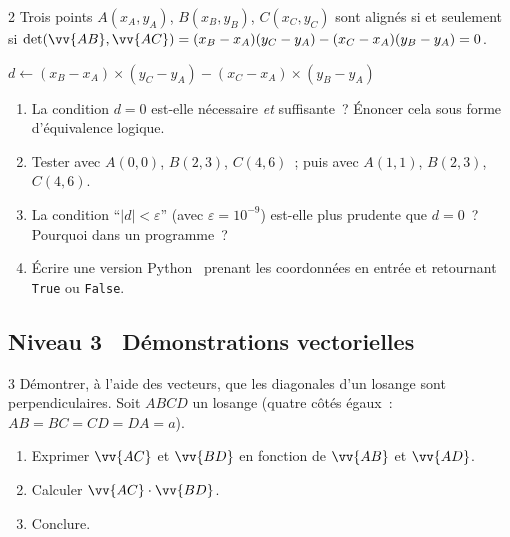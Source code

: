 \begin{exo}{2}
Trois points $A(x_A,y_A)$, $B(x_B,y_B)$, $C(x_C,y_C)$ sont align\'es
si et seulement si $\det(\vv{AB},\vv{AC}) = (x_B-x_A)(y_C-y_A)-(x_C-x_A)(y_B-y_A) = 0$.

\begin{algorithm}[H]
\caption{Test d'alignement de trois points}
$d \leftarrow (x_B-x_A)\times(y_C-y_A) - (x_C-x_A)\times(y_B-y_A)$\;
\end{algorithm}

\begin{enumerate}
  \item La condition $d=0$ est-elle n\'ecessaire \emph{et} suffisante~?
        \'Enoncer cela sous forme d'\'equivalence logique.
  \item Tester avec $A(0,0)$, $B(2,3)$, $C(4,6)$~;
        puis avec $A(1,1)$, $B(2,3)$, $C(4,6)$.
  \item La condition ``$|d| < \varepsilon$'' (avec $\varepsilon=10^{-9}$)
        est-elle plus prudente que $d=0$~?
        Pourquoi dans un programme~?
  \item \'Ecrire une version Python \computer\ prenant les coordonn\'ees
        en entr\'ee et retournant \texttt{True} ou \texttt{False}.
\end{enumerate}
\end{exo}

\subsection*{\quad Niveau 3 \textemdash\ D\'emonstrations vectorielles}

\begin{exo}{3}
D\'emontrer, \`a l'aide des vecteurs, que les diagonales d'un losange
sont perpendiculaires.
Soit $ABCD$ un losange (quatre c\^ot\'es \'egaux~: $AB=BC=CD=DA=a$).
\begin{enumerate}
  \item Exprimer $\vv{AC}$ et $\vv{BD}$ en fonction de $\vv{AB}$ et $\vv{AD}$.
  \item Calculer $\vv{AC}\cdot\vv{BD}$.
  \item Conclure.
\end{enumerate}
\end{exo}

